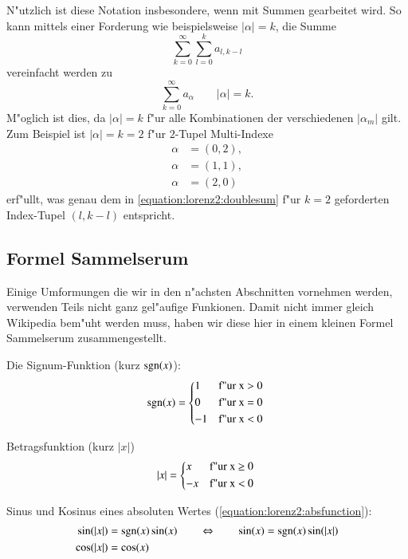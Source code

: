 \begin{refsection}
N"utzlich ist diese Notation insbesondere, wenn mit Summen gearbeitet wird. So 
kann mittels einer Forderung wie beispielsweise $|\alpha| = k$, die Summe
\begin{equation}
	\sum_{k = 0}^{\infty}\sum_{l = 0}^{k}a_{l, k - l}
	\label{equation:lorenz2:doublesum}
\end{equation}
vereinfacht werden zu
\begin{equation}
	\sum_{k = 0}^{\infty}a_{\alpha} \qquad |\alpha| = k.
	\label{equation:lorenz2:mmsum}
\end{equation}
M"oglich ist dies, da $|\alpha| = k$ f"ur alle Kombinationen der verschiedenen 
$|\alpha_m|$ gilt. Zum Beispiel ist $|\alpha| = k = 2$ f"ur $2$-Tupel 
Multi-Indexe
\begin{align*}
	\alpha &= (0, 2), \\
	\alpha &= (1, 1), \\
	\alpha &= (2, 0)
\end{align*}
erf"ullt, was genau dem in \cref{equation:lorenz2:doublesum} f"ur $k = 2$ 
geforderten Index-Tupel $(l, k - l)$ entspricht.

\subsection{Formel Sammelserum}
Einige Umformungen die wir in den n"achsten Abschnitten vornehmen werden, 
verwenden Teils nicht ganz gel"aufige Funkionen. Damit nicht immer gleich 
Wikipedia bem"uht werden muss, haben wir diese hier in einem kleinen 
Formel Sammelserum zusammengestellt.

Die Signum-Funktion (kurz $\sgn(x)$):
\begin{equation}
\sgn(x) =
\begin{cases*}
1 & f"ur x > 0 \\
0 & f"ur x = 0 \\
-1 & f"ur x < 0
\end{cases*}
\label{equation:lorenz2:signum}
\end{equation}

Betragsfunktion (kurz $|x|$)
\begin{equation}
|x| =
\begin{cases*}
x & f"ur x $\geq$ 0 \\
-x & f"ur x < 0
\end{cases*}
\label{equation:lorenz2:absfunction}
\end{equation}

Sinus und Kosinus eines absoluten Wertes (\cref{equation:lorenz2:absfunction}):
\begin{equation}
\begin{split}
\sin(|x|) &= \sgn(x)\sin(x) \qquad \Leftrightarrow \qquad \sin(x) = 
\sgn(x)\sin(|x|)
\\
\cos(|x|) &= \cos(x)
\end{split}
\label{equation:lorenz2:sincosabs}
\end{equation}


\end{refsection}
